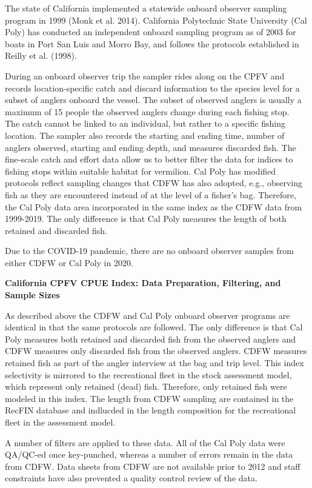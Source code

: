 \documentclass[
  english,
  a4paper,
]{article}
\begin{document}
The state of California implemented a statewide onboard observer sampling
program in 1999 (Monk et al. 2014). California Polytechnic State University (Cal
Poly) has conducted an independent onboard sampling
program as of 2003 for boats in Port San Luis and Morro Bay, and follows
the protocols established in Reilly et al. (1998).

During an onboard observer trip the sampler rides along on the CPFV and records
location-specific catch and discard information to the species level for a subset
of anglers onboard the vessel. The subset of observed anglers is usually a
maximum of 15 people the observed anglers change during each fishing stop.\\
The catch cannot be linked to an individual, but rather
to a specific fishing location. The sampler also records the starting and
ending time, number of anglers observed, starting and ending depth, and measures
discarded fish. The fine-scale catch and effort data allow us to better filter
the data for indices to fishing stops within suitable habitat for vermilion.
Cal Poly has modified protocols reflect sampling changes that CDFW
has also adopted, e.g., observing fish as they are encountered instead of at
the level of a fisher's bag. Therefore, the Cal Poly data area incorporated in
the same index as the CDFW data from 1999-2019. The only difference is that
Cal Poly measures the length of both retained and discarded fish.

Due to the COVID-19 pandemic, there are no onboard observer samples from either
CDFW or Cal Poly in 2020.

\textbf{California CPFV CPUE Index: Data Preparation, Filtering, and Sample Sizes}

As described above the CDFW and Cal Poly onboard observer programs are identical
in that the same protocols are followed. The only difference is that Cal Poly
measures both retained and discarded fish from the observed anglers and CDFW
measures only discarded fish from the observed anglers. CDFW measures retained
fish as part of the angler interview at the bag and trip level. This index
selectivity is mirrored to the recreational
fleet in the stock assessment model, which represent only retained (dead)
fish. Therefore, only retained fish were modeled in this index. The length
from CDFW sampling are contained in the RecFIN database and indlucded in the
length composition for the recreational fleet in the assessment model.

A number of filters are applied to these data. All of the Cal Poly data were
QA/QC-ed once key-punched, whereas a number of errors remain in the
data from CDFW. Data sheets from CDFW are not available prior to 2012 and
staff constraints have also prevented a quality control review of the data.
\end{document}
